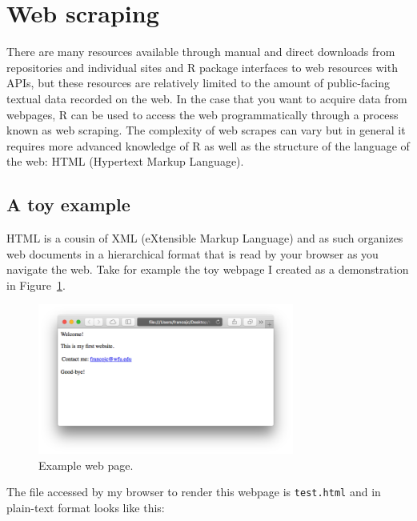 \documentclass[
  letterpaper,
]{latex/krantz}
\begin{document}
\hypertarget{web-scraping}{%
\section{Web scraping}\label{web-scraping}}

There are many resources available through manual and direct downloads
from repositories and individual sites and R package interfaces to web
resources with APIs, but these resources are relatively limited to the
amount of public-facing textual data recorded on the web. In the case
that you want to acquire data from webpages, R can be used to access the
web programmatically through a process known as web scraping. The
complexity of web scrapes can vary but in general it requires more
advanced knowledge of R as well as the structure of the language of the
web: HTML (Hypertext Markup Language).

\hypertarget{a-toy-example}{%
\subsection{A toy example}\label{a-toy-example}}

HTML is a cousin of XML (eXtensible Markup Language) and as such
organizes web documents in a hierarchical format that is read by your
browser as you navigate the web. Take for example the toy webpage I
created as a demonstration in Figure~\ref{fig-ad-example-webpage}.

\begin{figure}[h]

{\centering \includegraphics[width=0.75\textwidth,height=\textheight]{figures/acquire-data/example-webpage.png}

}

\caption{\label{fig-ad-example-webpage}Example web page.}

\end{figure}

The file accessed by my browser to render this webpage is
\texttt{test.html} and in plain-text format looks like this:
\end{document}
